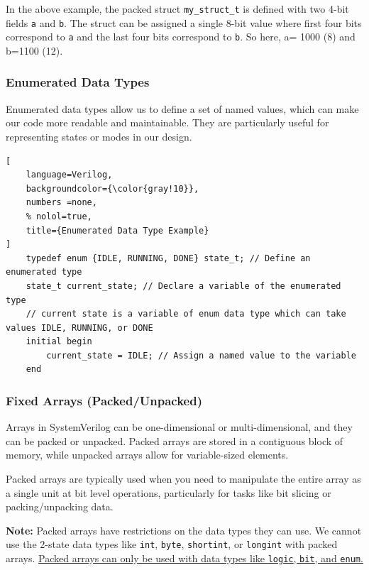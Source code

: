 \documentclass[12pt, a4paper]{article}
\begin{document}
In the above example, the packed struct \texttt{my\_struct\_t} is defined with two 4-bit fields \texttt{a} and \texttt{b}. The struct can be assigned a single 8-bit value where first four bits correspond to \texttt{a} and the last four bits correspond to \texttt{b}. So here, a= 1000 (8) and b=1100 (12).

\vspace{1em}

\subsubsection{Enumerated Data Types}

Enumerated data types allow us to define a set of named values, which can make our code more readable and maintainable. They are particularly useful for representing states or modes in our design.

\begin{lstlisting}[
    language=Verilog,
    backgroundcolor={\color{gray!10}},
    numbers =none,
    % nolol=true,
    title={Enumerated Data Type Example}
]
    typedef enum {IDLE, RUNNING, DONE} state_t; // Define an enumerated type
    state_t current_state; // Declare a variable of the enumerated type
    // current state is a variable of enum data type which can take values IDLE, RUNNING, or DONE
    initial begin
        current_state = IDLE; // Assign a named value to the variable
    end
\end{lstlisting}

\subsubsection{Fixed Arrays (Packed/Unpacked)}

Arrays in SystemVerilog can be one-dimensional or multi-dimensional, and they can be packed or unpacked. Packed arrays are stored in a contiguous block of memory, while unpacked arrays allow for variable-sized elements. 

Packed arrays are typically used when you need to manipulate the entire array as a single unit at bit level operations, particularly for tasks like bit slicing or packing/unpacking data.

\textbf{Note:} Packed arrays have restrictions on the data types they can use. We cannot use the 2-state data types like \texttt{int}, \texttt{byte}, \texttt{shortint}, or \texttt{longint} with packed arrays. \ul{Packed arrays can only be used with data types like \texttt{logic}, \texttt{bit}, and \texttt{enum}.}
\end{document}
